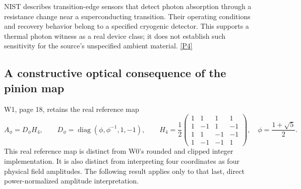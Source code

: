 NIST describes transition-edge sensors that detect photon absorption through
a resistance change near a superconducting transition. Their operating
conditions and recovery behavior belong to a specified cryogenic detector.
This supports a thermal photon witness as a real device class; it does not
establish such sensitivity for the source's unspecified ambient material.
\href{https://www.nist.gov/pml/productsservices/quantum-networks-nist/technologies-quantum-networks/single-photon-detectors}{[P4]}

\subsection{A constructive optical consequence of the pinion map}
\label{sec:want-pinion-passivity}

W1, page 18, retains the real reference map
\begin{equation}
 A_\phi=D_\phi H_4,\qquad
 D_\phi=\operatorname{diag}(\phi,\phi^{-1},1,-1),\qquad
 H_4=\frac12\begin{pmatrix}
 1&1&1&1\\1&-1&1&-1\\1&1&-1&-1\\1&-1&-1&1
 \end{pmatrix},\quad \phi=\frac{1+\sqrt5}{2}.
 \label{eq:want-pinion}
\end{equation}
This real reference map is distinct from W0's rounded and clipped integer
implementation. It is also distinct from interpreting four coordinates as
four physical field amplitudes. The following result applies only to that
last, direct power-normalized amplitude interpretation.

